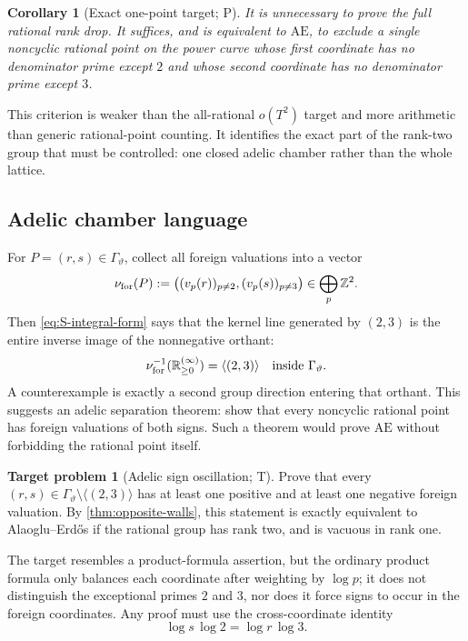 \documentclass[10pt,oneside]{article}
\newtheorem{corollary}[theorem]{Corollary}
\theoremstyle{definition}
\newtheorem{problem}[theorem]{Target problem}
\theoremstyle{remark}
\newcommand{\Z}{\mathbb Z}
\newcommand{\R}{\mathbb R}
\newcommand{\thetaq}{\vartheta}
\newcommand{\AEconj}{\mathrm{AE}}
\newcommand{\statusP}{\textsc{P}}
\newcommand{\statusT}{\textsc{T}}
\begin{document}
\begin{corollary}[Exact one-point target; \statusP]
\label{cor:one-point-target}
It is unnecessary to prove the full rational rank drop.  It suffices, and is equivalent to \(\AEconj\), to exclude a single noncyclic rational point on the power curve whose first coordinate has no denominator prime except \(2\) and whose second coordinate has no denominator prime except \(3\).
\end{corollary}

This criterion is weaker than the all-rational \(o(T^2)\) target and more arithmetic than generic rational-point counting.  It identifies the exact part of the rank-two group that must be controlled: one closed adelic chamber rather than the whole lattice.

\subsection{Adelic chamber language}
For \(P=(r,s)\in\Gamma_{\thetaq}\), collect all foreign valuations into a vector
\[
 \nu_{\rm for}(P)
 :=\bigl((v_p(r))_{p\ne2},(v_p(s))_{p\ne3}\bigr)
 \in\bigoplus_p\Z^2.
\]
Then \eqref{eq:S-integral-form} says that the kernel line generated by \((2,3)\) is the entire inverse image of the nonnegative orthant:
\[
 \nu_{\rm for}^{-1}(\R_{\ge0}^{(\infty)})
 =\langle(2,3)\rangle
 \quad\text{inside }\Gamma_{\thetaq}.
\]
A counterexample is exactly a second group direction entering that orthant.  This suggests an adelic separation theorem: show that every noncyclic rational point has foreign valuations of both signs.  Such a theorem would prove \(\AEconj\) without forbidding the rational point itself.

\begin{problem}[Adelic sign oscillation; \statusT]
\label{prob:adelic-sign}
Prove that every
\((r,s)\in\Gamma_{\thetaq}\setminus\langle(2,3)\rangle\)
has at least one positive and at least one negative foreign valuation.  By \cref{thm:opposite-walls}, this statement is exactly equivalent to Alaoglu--Erd\H{o}s if the rational group has rank two, and is vacuous in rank one.
\end{problem}

The target resembles a product-formula assertion, but the ordinary product formula only balances each coordinate after weighting by \(\log p\); it does not distinguish the exceptional primes \(2\) and \(3\), nor does it force signs to occur in the foreign coordinates.  Any proof must use the cross-coordinate identity
\[
 \log s\,\log2=\log r\,\log3.
\]
\end{document}
